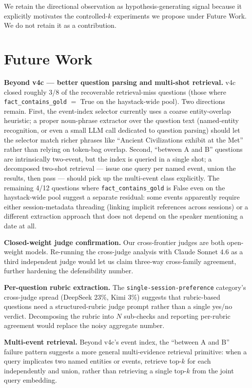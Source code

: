 \documentclass{article}
\begin{document}
We retain the directional observation as hypothesis-generating signal because it explicitly motivates the controlled-$k$ experiments we propose under Future Work. We do not retain it as a contribution.

\section{Future Work}
\label{sec:future}

\textbf{Beyond v4c --- better question parsing and multi-shot retrieval.} v4c closed roughly 3/8 of the recoverable retrieval-miss questions (those where \texttt{fact\_contains\_gold} $=$ True on the haystack-wide pool). Two directions remain. First, the event-index selector currently uses a coarse entity-overlap heuristic; a proper noun-phrase extractor over the question text (named-entity recognition, or even a small LLM call dedicated to question parsing) should let the selector match richer phrases like ``Ancient Civilizations exhibit at the Met'' rather than relying on token-bag overlap. Second, ``between A and B'' questions are intrinsically two-event, but the index is queried in a single shot; a decomposed two-shot retrieval --- issue one query per named event, union the results, then pass --- should pick up the multi-event class explicitly. The remaining 4/12 questions where \texttt{fact\_contains\_gold} is False even on the haystack-wide pool suggest a separate residual: some events apparently require either session-metadata threading (linking implicit references across sessions) or a different extraction approach that does not depend on the speaker mentioning a date at all.

\textbf{Closed-weight judge confirmation.} Our cross-frontier judges are both open-weight models. Re-running the cross-judge analysis with Claude Sonnet 4.6 as a third independent judge would let us claim three-way cross-family agreement, further hardening the defensibility number.

\textbf{Per-question rubric extraction.} The \texttt{single-session-preference} category's cross-judge spread (DeepSeek 23\%, Kimi 3\%) suggests that rubric-based questions need a structured-rubric judge prompt rather than a single yes/no verdict. Decomposing the rubric into $N$ sub-checks and reporting per-rubric agreement would replace the noisy aggregate number.

\textbf{Multi-event retrieval.} Beyond v4c's event index, the ``between A and B'' failure pattern suggests a more general multi-evidence retrieval primitive: when a query implicates two named entities or events, retrieve top-$k$ for each independently and union, rather than retrieving a single top-$k$ from the joint query embedding.
\end{document}
